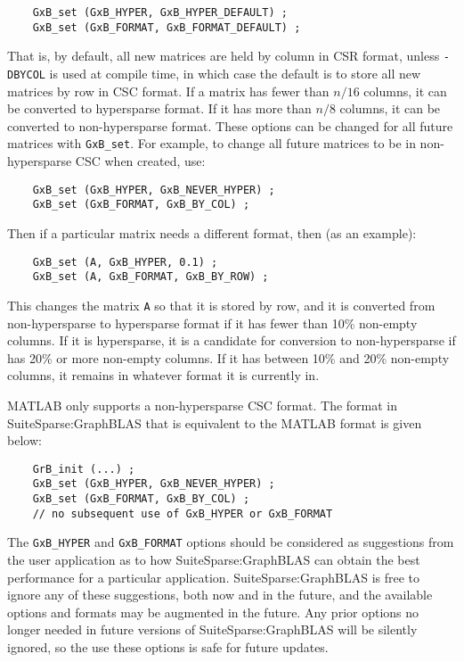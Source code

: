 \documentclass[12pt]{article}
\begin{document}
{\footnotesize
\begin{verbatim}
    GxB_set (GxB_HYPER, GxB_HYPER_DEFAULT) ;
    GxB_set (GxB_FORMAT, GxB_FORMAT_DEFAULT) ;
\end{verbatim} }

That is, by default, all new matrices are held by column in CSR format, unless
\verb'-DBYCOL' is used at compile time, in which case the default is to store
all new matrices by row in CSC format.  If a matrix has fewer than $n/16$
columns, it can be converted to hypersparse format.  If it has more than $n/8$
columns, it can be converted to non-hypersparse format.  These options can be
changed for all future matrices with \verb'GxB_set'.  For example, to change
all future matrices to be in non-hypersparse CSC when created, use:

{\footnotesize
\begin{verbatim}
    GxB_set (GxB_HYPER, GxB_NEVER_HYPER) ;
    GxB_set (GxB_FORMAT, GxB_BY_COL) ;
\end{verbatim} }

Then if a particular matrix needs a different format, then (as an example):

{\footnotesize
\begin{verbatim}
    GxB_set (A, GxB_HYPER, 0.1) ;
    GxB_set (A, GxB_FORMAT, GxB_BY_ROW) ;
\end{verbatim} }

This changes the matrix \verb'A' so that it is stored by row, and it is
converted from non-hypersparse to hypersparse format if it has fewer than 10\%
non-empty columns.  If it is hypersparse, it is a candidate for conversion to
non-hypersparse if has 20\% or more non-empty columns.  If it has between 10\%
and 20\% non-empty columns, it remains in whatever format it is currently in.

MATLAB only supports a non-hypersparse CSC format.  The format in
SuiteSparse:GraphBLAS that is equivalent to the MATLAB format is given below:

{\footnotesize
\begin{verbatim}
    GrB_init (...) ;
    GxB_set (GxB_HYPER, GxB_NEVER_HYPER) ;
    GxB_set (GxB_FORMAT, GxB_BY_COL) ;
    // no subsequent use of GxB_HYPER or GxB_FORMAT
\end{verbatim} }

The \verb'GxB_HYPER' and \verb'GxB_FORMAT' options should be considered as
suggestions from the user application as to how SuiteSparse:GraphBLAS can
obtain the best performance for a particular application.
SuiteSparse:GraphBLAS is free to ignore any of these suggestions, both now and
in the future, and the available options and formats may be augmented in the
future.  Any prior options no longer needed in future versions of
SuiteSparse:GraphBLAS will be silently ignored, so the use these options is
safe for future updates.
\end{document}
